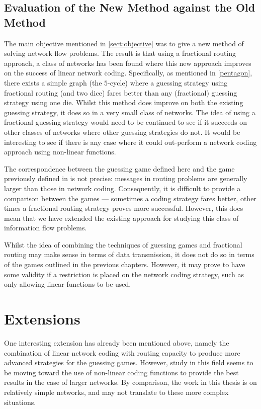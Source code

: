 \subsection{Evaluation of the New Method against the Old Method}

The main objective mentioned in \autoref{sect:objective} was to give a new method of solving network flow problems. The result is that using a fractional routing approach, a class of networks has been found where this new approach improves on the success of linear network coding. Specifically, as mentioned in \autoref{pentagon}, there exists a simple graph (the $5$-cycle) where a guessing strategy using fractional routing (and two dice) fares better than any (fractional) guessing strategy using one die. Whilst this method does improve on both the existing guessing strategy, it does so in a very small class of networks. The idea of using a fractional guessing strategy would need to be continued to see if it succeeds on other classes of networks where other guessing strategies do not. It would be interesting to see if there is any case where it could out-perform a network coding approach using non-linear functions.

The correspondence between the guessing game defined here and the game previously defined in \cite{riis2005util} is not precise: messages in routing problems are generally larger than those in network coding. Consequently, it is difficult to provide a comparison between the games --- sometimes a coding strategy fares better, other times a fractional routing strategy proves more successful. However, this does mean that we have extended the existing approach for studying this class of information flow problems.

Whilst the idea of combining the techniques of guessing games and fractional routing may make sense in terms of data transmission, it does not do so in terms of the games outlined in the previous chapters. However, it may prove to have some validity if a restriction is placed on the network coding strategy, such as only allowing linear functions to be used.

\newpage

\section{Extensions}

One interesting extension has already been mentioned above, namely the combination of linear network coding with routing capacity to produce more advanced strategies for the guessing games. However, study in this field seems to be moving toward the use of non-linear coding functions to provide the best results in the case of larger networks. By comparison, the work in this thesis is on relatively simple networks, and may not translate to these more complex situations.

